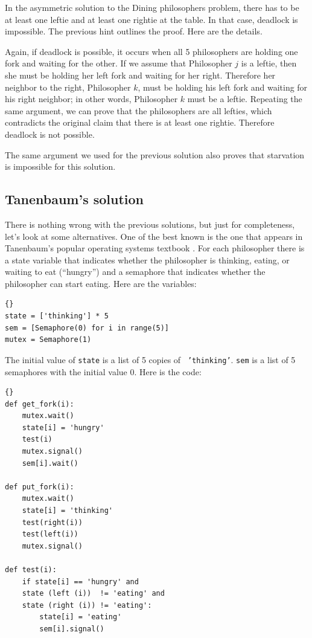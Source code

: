 \documentclass{book}
\newcommand{\clearemptydoublepage}{\newpage\cleardoublepage}
\begin{document}
In the asymmetric solution to the Dining philosophers problem,
there has to be at least one leftie and at least one rightie at
the table.  In that case, deadlock is impossible.  The previous
hint outlines the proof.  Here are the details.

Again, if deadlock is possible, it occurs when all 5 philosophers
are holding one fork and waiting for the other.  If we assume that
Philosopher $j$ is a leftie, then she must be holding her left
fork and waiting for her right.  Therefore her neighbor to the right,
Philosopher $k$, must be holding his left fork and waiting for
his right neighbor; in other words, Philosopher $k$ must be a leftie.
Repeating the same argument, we can prove that the philosophers
are all lefties, which contradicts the original claim that there
is at least one rightie.  Therefore deadlock is not possible.

The same argument we used for the previous solution also proves
that starvation is impossible for this solution.


\clearemptydoublepage
\subsection{Tanenbaum's solution}

There is nothing wrong with the previous solutions, but just for
completeness, let's look at some alternatives.  One of the best known
is the one that appears in Tanenbaum's popular operating systems
textbook \cite{tanenbaum}.
For each philosopher there is a state variable that
indicates whether the philosopher is thinking, eating, or waiting to
eat (``hungry'') and a semaphore that indicates whether the
philosopher can start eating.  Here are the variables:

\begin{lstlisting}[caption={Variables for Tanenbaum's solution}]{}
state = ['thinking'] * 5
sem = [Semaphore(0) for i in range(5)]
mutex = Semaphore(1)
\end{lstlisting}

The initial value of {\tt state} is a list of 5 copies of {\tt
'thinking'}.  {\tt sem} is a list of 5 semaphores with the initial
value 0.  Here is the code:

\begin{lstlisting}[caption={Tanenbaum's solution}]{}
def get_fork(i):
    mutex.wait()
    state[i] = 'hungry'
    test(i)
    mutex.signal()
    sem[i].wait()

def put_fork(i):
    mutex.wait()
    state[i] = 'thinking'
    test(right(i))
    test(left(i))
    mutex.signal()

def test(i):
    if state[i] == 'hungry' and
    state (left (i))  != 'eating' and
    state (right (i)) != 'eating':
        state[i] = 'eating'
        sem[i].signal()
\end{lstlisting}
\end{document}

